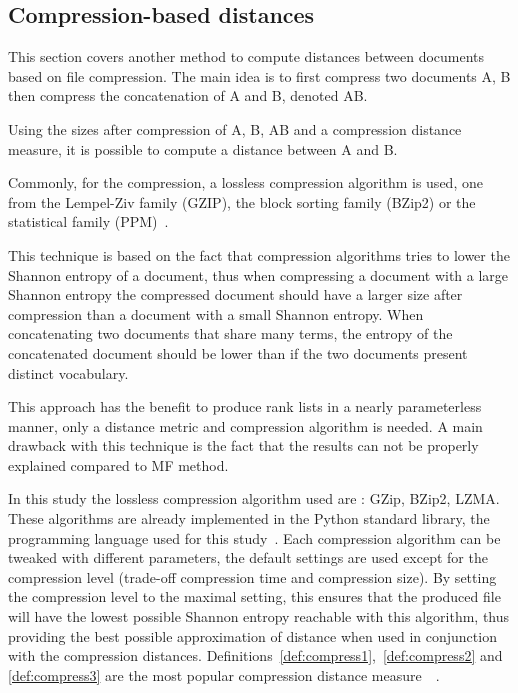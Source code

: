 \subsection{Compression-based distances \label{sec:compression_based_distances}}

This section covers another method to compute distances between documents based on file compression.
The main idea is to first compress two documents A, B then compress the concatenation of A and B, denoted AB.

Using the sizes after compression of A, B, AB and a compression distance measure, it is possible to compute a distance between A and B.

Commonly, for the compression, a lossless compression algorithm is used, one from the Lempel-Ziv family (GZIP), the block sorting family (BZip2) or the statistical family (PPM)~\cite{comparing_compression}.

This technique is based on the fact that compression algorithms tries to lower the Shannon entropy of a document, thus when compressing a document with a large Shannon entropy the compressed document should have a larger size after compression than a document with a small Shannon entropy.
When concatenating two documents that share many terms, the entropy of the concatenated document should be lower than if the two documents present distinct vocabulary.

This approach has the benefit to produce rank lists in a nearly parameterless manner, only a distance metric and compression algorithm is needed.
A main drawback with this technique is the fact that the results can not be properly explained compared to MF method.

In this study the lossless compression algorithm used are : GZip, BZip2, LZMA.
These algorithms are already implemented in the Python standard library, the programming language used for this study~\cite{python_standard_library}.
Each compression algorithm can be tweaked with different parameters, the default settings are used except for the compression level (trade-off compression time and compression size).
By setting the compression level to the maximal setting, this ensures that the produced file will have the lowest possible Shannon entropy reachable with this algorithm, thus providing the best possible approximation of distance when used in conjunction with the compression distances.
Definitions~\ref{def:compress1},~\ref{def:compress2} and \ref{def:compress3} are the most popular compression distance measure~\cite{comparing_compression}~\cite{savoy_stylo}.

